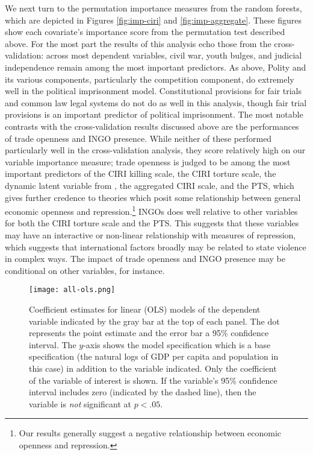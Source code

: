 \documentclass[11pt]{article}
\begin{document}
We next turn to the permutation importance measures from the random forests, which are depicted in Figures \ref{fig:imp-ciri} and \ref{fig:imp-aggregate}. These figures show each covariate's importance score from the permutation test described above. For the most part the results of this analysis echo those from the cross-validation: across most dependent variables, civil war, youth bulges, and judicial independence remain among the most important predictors. As above, Polity and its various components, particularly the competition component, do extremely well in the political imprisonment model. Constitutional provisions for fair trials and common law legal systems do not do as well in this analysis, though fair trial provisions is an important predictor of political imprisonment. The most notable contrasts with the cross-validation results discussed above are the performances of trade openness and INGO presence. While neither of these performed particularly well in the cross-validation analysis, they score relatively high on our variable importance measure; trade openness is judged to be among the most important predictors of the CIRI killing scale, the CIRI torture scale, the dynamic latent variable from \citet{Fariss2013}, the aggregated CIRI scale, and the PTS, which gives further credence to theories which posit some relationship between general economic openness and repression.\footnote{Our results generally suggest a negative relationship between economic openness and repression.} INGOs does well relative to other variables for both the CIRI torture scale and the PTS. This suggests that these variables may have an interactive or non-linear relationship with measures of repression, which suggests that international factors broadly may be related to state violence in complex ways. The impact of trade openness and INGO presence may be conditional on other variables, for instance. 

\begin{figure}[!htpb]
\texttt{[image: all-ols.png]}
\caption{Coefficient estimates for linear (OLS) models of the dependent variable indicated by the gray bar at the top of each panel. The dot represents the point estimate and the error bar a 95\% confidence interval. The $y$-axis shows the model specification which is a base specification (the natural logs of GDP per capita and population in this case) in addition to the variable indicated. Only the coefficient of the variable of interest is shown. If the variable's 95\% confidence interval includes zero (indicated by the dashed line), then the variable is \textit{not} significant at $p < .05$.}
\label{fig:all-ols}
\end{figure}
\end{document}
